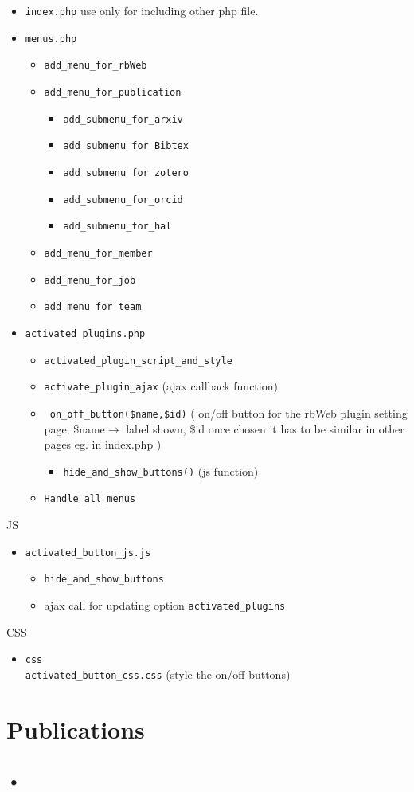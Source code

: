 \documentclass[11pt]{article}
\begin{document}
\begin{itemize}
\item \texttt{index.php}
use only for including other php file. 


\item \texttt{menus.php}
\begin{itemize}
\item \texttt{add\_menu\_for\_rbWeb}
\item \texttt{add\_menu\_for\_publication}
\begin{itemize}
\item \texttt{add\_submenu\_for\_arxiv}
\item \texttt{add\_submenu\_for\_Bibtex}
\item \texttt{add\_submenu\_for\_zotero}
\item \texttt{add\_submenu\_for\_orcid}
\item \texttt{add\_submenu\_for\_hal}
\end{itemize}
\item \texttt{add\_menu\_for\_member}
\item \texttt{add\_menu\_for\_job}
\item \texttt{add\_menu\_for\_team}
\end{itemize}
\item \texttt{activated\_plugins.php}
\begin{itemize}
\item \texttt{activated\_plugin\_script\_and\_style}
\item \texttt{activate\_plugin\_ajax} (ajax callback function) 
\item \texttt{ on\_off\_button(\$name,\$id)} ( on/off button for the rbWeb plugin setting page, \$name$\rightarrow$ label shown, \$id once chosen it has to be similar in other pages eg. in index.php )
\begin{itemize}
\item \texttt{hide\_and\_show\_buttons()} (js function)
\end{itemize}
\item \texttt{Handle\_all\_menus} 
\end{itemize}


\end{itemize}

JS 
\begin{itemize}
\item \texttt{activated\_button\_js.js}
\begin{itemize}
\item \texttt{hide\_and\_show\_buttons}
\item ajax call for updating option \texttt{activated\_plugins}
\end{itemize}
\end{itemize}

CSS 
\begin{itemize}
\item \texttt{css\\activated\_button\_css.css} (style the on/off buttons)

\end{itemize}


\section{Publications}
\subsection{•}
\end{document}
